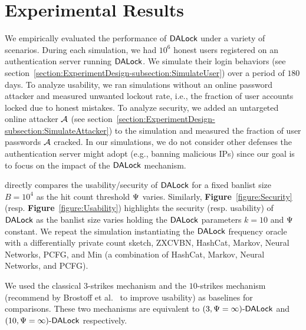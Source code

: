 
\section{Experimental Results}\label{section:experimentalresult} %

We empirically evaluated the performance of $\mathsf{DALock}$ under a variety of scenarios. During each simulation, we had $10^6$ honest users registered on an authentication server running $\mathsf{DALock}$. We simulate their login behaviors (see section~\ref{section:ExperimentDesign-subsection:SimulateUser}) over a period of $180$ days. To analyze usability, we ran simulations without an online password attacker and measured unwanted lockout rate, i.e., the fraction of user accounts locked due to honest mistakes. To analyze security, we added an untargeted online attacker $\mathcal{A}$ (see section~\ref{section:ExperimentDesign-subsection:SimulateAttacker}) to the simulation and measured the fraction of user passwords $\mathcal{A}$ cracked.  In our simulations, we do not consider other defenses the authentication server might adopt (e.g., banning malicious IPs) since our goal is to focus on the impact of the $\mathsf{DALock}$ mechanism.


  directly compares the usability/security of $\mathsf{DALock}$ for a fixed banlist size $B=10^4$ as the hit count threshold $\Psi$ varies. Similarly, \textbf{Figure}~\ref{figure:Security} (resp. \textbf{Figure}~\ref{figure:Usability}) highlights the security (resp. usability) of $\mathsf{DALock}$ as the banlist size varies holding the $\mathsf{DALock}$ parameters $k=10$ and $\Psi$ constant. We repeat the simulation  instantiating the $\mathsf{DALock}$ frequency oracle with a differentially private count sketch, ZXCVBN, HashCat, Markov, Neural Networks, PCFG, and Min (a combination of HashCat, Markov, Neural Networks, and PCFG). 


 We used the classical $3$-strikes mechanism and the $10$-strikes mechanism (recommend by Brostoff et al.~\cite{brostoff2003ten} to improve usability) as baselines for comparisons. These two mechanisms are equivalent to $(3, \Psi=\infty)\text{-}\mathsf{DALock}$ and $(10, \Psi=\infty)\text{-}\mathsf{DALock}$ respectively. 








